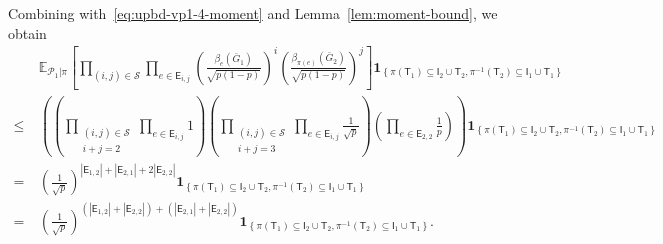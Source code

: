 \documentclass[letterpaper,11pt]{article}
\theoremstyle{definition}
\newcommand{\maP}{\mathcal{P}}
\newcommand{\maS}{\mathcal{S}}
\newcommand{\nbr}[1]{{\sf\color{red}[#1]}}
\newcommand{\pth}[1]{\left( #1 \right)}
\newcommand{\qth}[1]{\left[ #1 \right]}
\newcommand{\sfE}{{\mathsf{E}}}
\newcommand{\sfI}{{\mathsf{I}}}
\newcommand{\sfT}{{\mathsf{T}}}
\newcommand{\indc}[1]{{\mathbf{1}_{\left\{{#1}\right\}}}}
\def\E{\mathbb{E}}
\begin{document}
Combining with~\eqref{eq:upbd-vp1-4-moment} and Lemma~\ref{lem:moment-bound}, we obtain 
\begin{align}
    \nonumber &~\E_{\maP_1|\pi}\qth{\prod_{(i,j)\in \maS}\prod_{e\in \sfE_{i,j}} \pth{\frac{\beta_e(\bar{G}_1)}{\sqrt{p(1-p)}}}^i\pth{\frac{\beta_{\pi(e)}(\bar{G}_2)}{\sqrt{p(1-p)}}}^{j}} \indc{\pi(\sfT_1)\subseteq \sfI_2\cup \sfT_2,\pi^{-1}(\sfT_2)\subseteq \sfI_1\cup \sfT_1}\\\nonumber
    \le&~ \pth{\pth{\prod_{\substack{(i,j)\in \maS\\ i+j=2}} \prod_{e\in \sfE_{i,j}}1 }\pth{\prod_{\substack{(i,j)\in \maS\\ i+j=3}} \prod_{e\in \sfE_{i,j}} \frac{1}{\sqrt{p}} }\pth{\prod_{e\in \sfE_{2,2}} \frac{1}{p}}} \indc{\pi(\sfT_1)\subseteq \sfI_2\cup \sfT_2,\pi^{-1}(\sfT_2)\subseteq \sfI_1\cup \sfT_1}\\\nonumber
    =&~\pth{\frac{1}{\sqrt{p}}}^{|\sfE_{1,2}|+|\sfE_{2,1}|+2|\sfE_{2,2}|} \indc{\pi(\sfT_1)\subseteq \sfI_2\cup \sfT_2,\pi^{-1}(\sfT_2)\subseteq \sfI_1\cup \sfT_1}\\\label{eq:upbd-vp1-4-sqrtp}=&~\pth{\frac{1}{\sqrt{p}}}^{(|\sfE_{1,2}|+| \sfE_{2,2}|)+(|\sfE_{2,1}|+ |\sfE_{2,2}|)} \indc{\pi(\sfT_1)\subseteq \sfI_2\cup \sfT_2,\pi^{-1}(\sfT_2)\subseteq \sfI_1\cup \sfT_1}.
\end{align}
 
\end{document}
